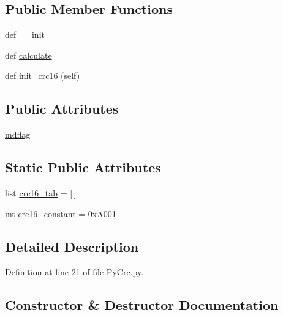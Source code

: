 \subsection*{Public Member Functions}
\begin{DoxyCompactItemize}
\item 
def \hyperlink{class_tlmy_cmd_processor_1_1_py_crc_1_1_c_r_c16_a453ab563fd33baeb5fe12dece375a3ad}{\+\_\+\+\_\+init\+\_\+\+\_\+}
\item 
def \hyperlink{class_tlmy_cmd_processor_1_1_py_crc_1_1_c_r_c16_a20af3945be0d572a8e8e5c5f14454caf}{calculate}
\item 
def \hyperlink{class_tlmy_cmd_processor_1_1_py_crc_1_1_c_r_c16_ab69a3aa74f4f25771442a12a1f885bd1}{init\+\_\+crc16} (self)
\end{DoxyCompactItemize}
\subsection*{Public Attributes}
\begin{DoxyCompactItemize}
\item 
\hyperlink{class_tlmy_cmd_processor_1_1_py_crc_1_1_c_r_c16_a4943c0b3e32ec33fd62efe9b07dc1ff9}{mdflag}
\end{DoxyCompactItemize}
\subsection*{Static Public Attributes}
\begin{DoxyCompactItemize}
\item 
list \hyperlink{class_tlmy_cmd_processor_1_1_py_crc_1_1_c_r_c16_a5ac464e6ba8820da42c067f186affdfe}{crc16\+\_\+tab} = \mbox{[}$\,$\mbox{]}
\item 
int \hyperlink{class_tlmy_cmd_processor_1_1_py_crc_1_1_c_r_c16_a95c493f628de8e4da4850a721b083567}{crc16\+\_\+constant} = 0x\+A001
\end{DoxyCompactItemize}


\subsection{Detailed Description}


Definition at line 21 of file Py\+Crc.\+py.



\subsection{Constructor \& Destructor Documentation}
\hypertarget{class_tlmy_cmd_processor_1_1_py_crc_1_1_c_r_c16_a453ab563fd33baeb5fe12dece375a3ad}{}
